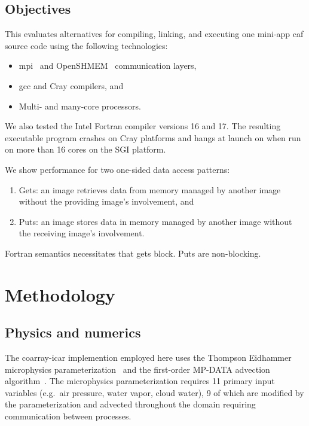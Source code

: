 \subsection{Objectives}
This evaluates alternatives for compiling, linking, and executing one
\gls{mini-app} \gls{caf} source code using the following technologies:
\begin{itemize}
  \item \gls{mpi}~\cite{mpiforum2016mpi} and OpenSHMEM~\cite{openshmem2016} communication layers,
  \item \gls{gcc} and Cray compilers, and
  \item Multi- and many-core processors.
\end{itemize}
We also tested the Intel Fortran compiler versions 16 and 17. The resulting executable
program crashes on Cray platforms and hangs at launch on when run on more than 16 cores on the SGI platform.

We show performance for two one-sided data access patterns:
\begin{enumerate}
  \item Gets: an image retrieves data from memory managed by another
        image without the providing image's involvement, and
  \item Puts: an image stores data in memory managed by
        another image without the receiving image's involvement.
\end{enumerate}
Fortran semantics necessitates that gets block.  Puts are non-blocking.


\section{Methodology}
\subsection{Physics and numerics}
The coarray-\gls{icar} implemention employed here uses the Thompson Eidhammer microphysics parameterization~\cite{Thompson:2014cw} and the first-order MP-DATA advection algorithm~\cite{Smolarkiewicz:1998il}.
The microphysics parameterization requires 11 primary input variables (e.g.\ air pressure, water vapor, cloud water), 9 of which are modified by the parameterization and advected throughout the domain requiring communication between processes.

